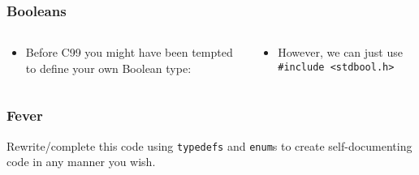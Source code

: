 \begin{frame}[fragile]
\frametitle{Booleans}
\begin{columns}

\begin{column}{0.45\textwidth}
\begin{itemize}[<+->]
\item Before C99 you might have been tempted to define your own Boolean type:
\end{itemize}

\end{column}

\pause
\begin{column}{0.45\textwidth}
\begin{itemize}[<+->]
\item However, we can just use \verb^#include <stdbool.h>^
\end{itemize}

\end{column}

\end{columns}
\end{frame}


\begin{frame}[fragile]
\frametitle{Fever}
Rewrite/complete this code using \verb^typedefs^ and \verb^enum^s to
create self-documenting code in any manner you wish.

\end{frame}

